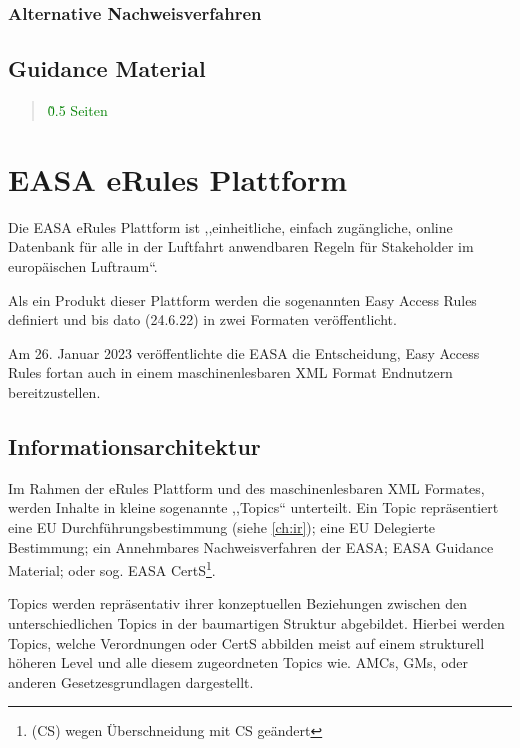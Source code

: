     \subsubsection{Alternative Nachweisverfahren}
        
        

\subsection{Guidance Material}

\begin{quote}
\textcolor{green}{\~0.5 Seiten}
\end{quote}
        \pagebreak
    \section{EASA eRules Plattform}

    Die \ac{EASA} eRules Plattform ist ,,einheitliche, einfach zugängliche, online Datenbank für alle in der Luftfahrt anwendbaren Regeln für Stakeholder im europäischen Luftraum``.
    \cite[5]{easa_xml_doc}

    Als ein Produkt dieser Plattform werden die sogenannten Easy Access Rules definiert und bis dato (24.6.22) in zwei Formaten veröffentlicht. 

    
Am 26. Januar 2023 veröffentlichte die EASA die Entscheidung, Easy Access Rules fortan auch in einem maschinenlesbaren XML Format Endnutzern bereitzustellen. \cite{easa_xml_publication}


\subsection{Informationsarchitektur}

    Im Rahmen der eRules Plattform und des maschinenlesbaren \ac{XML} Formates, werden Inhalte in kleine sogenannte ,,Topics`` unterteilt.
    Ein Topic repräsentiert eine \ac{EU} Durchführungsbestimmung (siehe \ref{ch:ir}); eine \ac{EU} Delegierte Bestimmung; ein Annehmbares Nachweisverfahren der \ac{EASA}; \ac{EASA} Guidance Material; oder sog. \ac{EASA} \acf{CertS}\footnote{(CS) wegen Überschneidung mit \acf{CS} geändert}. \cite[S. 5f]{easa_xml_doc}
    
Topics werden repräsentativ ihrer konzeptuellen Beziehungen zwischen den unterschiedlichen Topics in der baumartigen Struktur abgebildet.
Hierbei werden Topics, welche Verordnungen oder \ac{CertS} abbilden meist auf einem strukturell höheren Level und alle diesem zugeordneten Topics wie. \acsp{AMC}, \acsp{GM}, oder anderen Gesetzesgrundlagen dargestellt.


